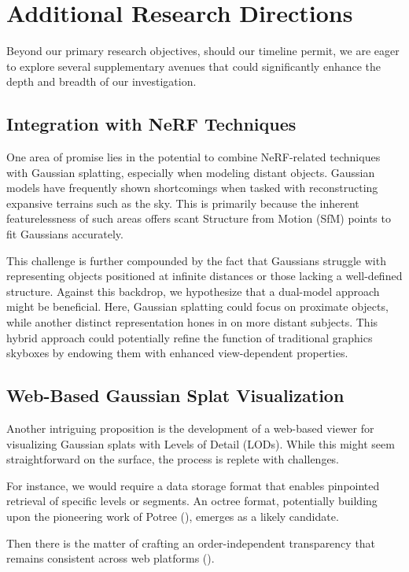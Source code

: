 \documentclass[logo,bsc,singlespacing,parskip]{infthesis}
\begin{document}
\chapter{Additional Research Directions}

Beyond our primary research objectives, should our timeline permit, we are eager to explore several supplementary avenues that could significantly enhance the depth and breadth of our investigation.

\section{Integration with NeRF Techniques}

One area of promise lies in the potential to combine NeRF-related techniques with Gaussian splatting, especially when modeling distant objects. Gaussian models have frequently shown shortcomings when tasked with reconstructing expansive terrains such as the sky. This is primarily because the inherent featurelessness of such areas offers scant Structure from Motion (SfM) points to fit Gaussians accurately.

This challenge is further compounded by the fact that Gaussians struggle with representing objects positioned at infinite distances or those lacking a well-defined structure. Against this backdrop, we hypothesize that a dual-model approach might be beneficial. Here, Gaussian splatting could focus on proximate objects, while another distinct representation hones in on more distant subjects. This hybrid approach could potentially refine the function of traditional graphics skyboxes by endowing them with enhanced view-dependent properties.

\section{Web-Based Gaussian Splat Visualization}

Another intriguing proposition is the development of a web-based viewer for visualizing Gaussian splats with Levels of Detail (LODs). While this might seem straightforward on the surface, the process is replete with challenges.

For instance, we would require a data storage format that enables pinpointed retrieval of specific levels or segments. An octree format, potentially building upon the pioneering work of Potree (\cite{potree}), emerges as a likely candidate.

Then there is the matter of crafting an order-independent transparency that remains consistent across web platforms (\cite{webglsplat}).
\end{document}
